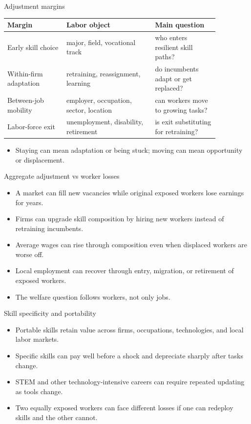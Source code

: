 \documentclass[aspectratio=169,11pt]{beamer}
\begin{document}
\begin{frame}{Adjustment margins}
\small
\begin{tabular}{p{0.24\linewidth} p{0.36\linewidth} p{0.26\linewidth}}
\toprule
Margin & Labor object & Main question \\
\midrule
Early skill choice & major, field, vocational track & who enters resilient skill paths? \\
Within-firm adaptation & retraining, reassignment, learning & do incumbents adapt or get replaced? \\
Between-job mobility & employer, occupation, sector, location & can workers move to growing tasks? \\
Labor-force exit & unemployment, disability, retirement & is exit substituting for retraining? \\
\bottomrule
\end{tabular}
\vspace{0.35cm}
\begin{itemize}
    \item Staying can mean adaptation or being stuck; moving can mean opportunity or displacement.
\end{itemize}
\end{frame}

\begin{frame}{Aggregate adjustment vs worker losses}
\begin{itemize}
    \item A market can fill new vacancies while original exposed workers lose earnings for years.
    \item Firms can upgrade skill composition by hiring new workers instead of retraining incumbents.
    \item Average wages can rise through composition even when displaced workers are worse off.
    \item Local employment can recover through entry, migration, or retirement of exposed workers.
    \item The welfare question follows workers, not only jobs.
\end{itemize}
\end{frame}

\begin{frame}{Skill specificity and portability}
\begin{itemize}
    \item Portable skills retain value across firms, occupations, technologies, and local labor markets.
    \item Specific skills can pay well before a shock and depreciate sharply after tasks change.
    \item STEM and other technology-intensive careers can require repeated updating as tools change.
    \item Two equally exposed workers can face different losses if one can redeploy skills and the other cannot.
\end{itemize}
\end{frame}
\end{document}

